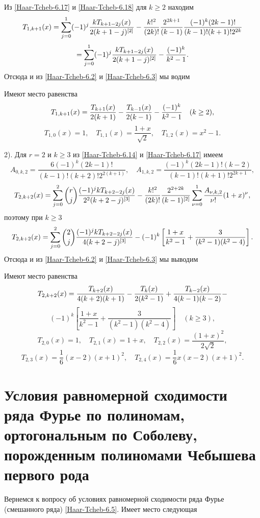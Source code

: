Из \eqref{Haar-Tcheb-6.17} и \eqref{Haar-Tcheb-6.18}  для $k\ge2$ находим
$$
T_{1,k+1}(x)=\sum_{j=0}^1(-1)^j
{kT_{k+1-2j}(x)\over2(k+1-j)^{[2]}}-\frac{k!^2}{(2k)!}
\frac{2^{2k+1}}{(k-1)}\frac{(-1)^{k}(2k-1)!}{(k-1)!(k+1)!2^{2k}}
$$
$$
=\sum_{j=0}^1(-1)^j
{kT_{k+1-2j}(x)\over2(k+1-j)^{[2]}}-\frac{(-1)^k}{k^2-1}.
$$
Отсюда и из \eqref{Haar-Tcheb-6.2} и \eqref{Haar-Tcheb-6.3} мы водим
\begin{corollary} Имеют место равенства
\begin{equation}\label{Haar-Tcheb-6.19}
T_{1,k+1}(x)={T_{k+1}(x)\over2(k+1)}- {T_{k-1}(x)\over2(k-1)} -\frac{(-1)^k}{k^2-1}\quad (k\ge 2),
\end{equation}
\begin{equation}\label{Haar-Tcheb-6.20}
T_{1,0}(x)=1, \quad T_{1,1}(x)=\frac{1+x}{\sqrt{2}}, \quad T_{1,2}(x)=x^2-1.
\end{equation}
\end{corollary}
2). Для $r=2$ и $k\ge3$ из \eqref{Haar-Tcheb-6.14} и \eqref{Haar-Tcheb-6.17} имеем
$$
A_{0,k,2}=\frac{6(-1)^{k}(2k-1)!}{(k-1)! (k+2)!2^{2(k+1)}},\quad A_{1,k,2}=\frac{(-1)^{k}(2k-1)!(k-2)}{(k-1)! (k+1)!2^{2k+1}},
$$
$$
T_{2,k+2}(x)=\sum_{j=0}^2{r\choose j}
{(-1)^jkT_{k+2-2j}(x)\over2^2(k+2-j)^{[3]}}
-\frac{k!^2}{(2k)!}
\frac{2^{2+2k}}{(k-1)^{[2]}}\sum^1_{\nu=0}\frac{A_{\nu,k,2}}{\nu!}(1+x)^{\nu},
$$
поэтому при $k\ge3$
$$
T_{2,k+2}(x)=\sum_{j=0}^2{2\choose j}
{(-1)^jkT_{k+2-2j}(x)\over4(k+2-j)^{[3]}}
-(-1)^k\left[\frac{1+x}{k^2-1}+\frac{3}{(k^2-1)(k^2-4)}\right].
$$
Отсюда и из \eqref{Haar-Tcheb-6.2} и \eqref{Haar-Tcheb-6.3} мы выводим
\begin{corollary} Имеют место равенства
$$
T_{2,k+2}(x)={T_{k+2}(x)\over4(k+2)(k+1)}-{T_{k}(x)\over2(k^2-1)}+
{T_{k-2}(x)\over4(k-1)(k-2)}-
$$
\begin{equation}\label{Haar-Tcheb-6.21}
(-1)^k\left[\frac{1+x}{k^2-1}+\frac{3}{(k^2-1)(k^2-4)}\right]\quad(k\ge3),
\end{equation}
\begin{equation}\label{Haar-Tcheb-6.22}
T_{2,0}(x)=1, \quad T_{2,1}(x)=1+x, \quad T_{2,2}(x)=\frac{(1+x)^2}{2\sqrt{2}},
\end{equation}
\begin{equation}\label{Haar-Tcheb-6.23}
T_{2,3}(x)=\frac16(x-2)(x+1)^2, \quad T_{2,4}(x)=\frac16x(x-2)(x+1)^2.
\end{equation}
\end{corollary}

\section{Условия равномерной сходимости ряда Фурье по полиномам, ортогональным по Соболеву, порожденным полиномами Чебышева первого рода}
Вернемся к вопросу об условиях равномерной сходимости ряда Фурье (смешанного ряда) \eqref{Haar-Tcheb-6.5}. Имеет место следующая

